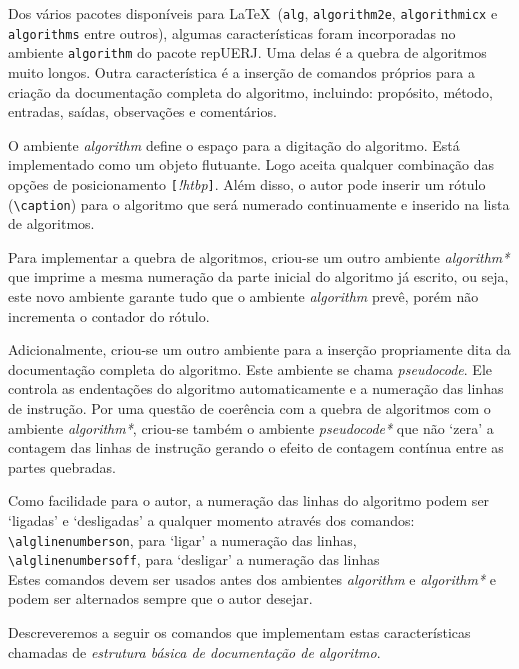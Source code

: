 \documentclass[a4paper,12pt,oneside,onecolumn]{article}
\newcommand{\comando}[1]{\texttt{\textbackslash #1}}
\newcommand{\opcoes}[1]{\texttt{[}\textsl{#1}\texttt{]}}
\newcommand{\repUERJ}{\textsf{repUERJ}}
\begin{document}
Dos vários pacotes disponíveis para \LaTeX\ (\texttt{alg}, \texttt{algorithm2e}, \texttt{algorithmicx} e \texttt{algorithms} entre outros), algumas características foram incorporadas no ambiente \texttt{algorithm} do pacote \repUERJ. Uma delas é a quebra de algoritmos muito longos. Outra característica é a inserção de comandos próprios para a criação da documentação completa do algoritmo, incluindo: propósito, método, entradas, saídas, observações e comentários.

O ambiente \textsl{algorithm} define o espaço para a digitação do algoritmo. Está implementado como um objeto flutuante. Logo aceita qualquer combinação das opções de posicionamento \opcoes{!htbp}. Além disso, o autor pode inserir um rótulo (\comando{caption}) para o algoritmo que será numerado continuamente e inserido na lista de algoritmos.

Para implementar a quebra de algoritmos, criou-se um outro ambiente \textsl{algorithm*} que imprime a mesma numeração da parte inicial do algoritmo já escrito, ou seja, este novo ambiente garante tudo que o ambiente \textsl{algorithm} prevê, porém não incrementa o contador do rótulo.

Adicionalmente, criou-se um outro ambiente para a inserção propriamente dita da documentação completa do algoritmo. Este ambiente se chama \textsl{pseudocode}. Ele controla as endentações do algoritmo automaticamente e a numeração das linhas de instrução. Por uma questão de coerência com a quebra de algoritmos com o ambiente \textsl{algorithm*}, criou-se também o ambiente \textsl{pseudocode*} que não `zera' a contagem das linhas de instrução gerando o efeito de contagem contínua entre as partes quebradas.

Como facilidade para o autor, a numeração das linhas do algoritmo podem ser `ligadas' e `desligadas' a qualquer momento através dos comandos:\\

  \comando{alglinenumberson}, para `ligar' a numeração das linhas,\\

  \comando{alglinenumbersoff}, para `desligar' a numeração das linhas\\

Estes comandos devem ser usados antes dos ambientes \textsl{algorithm} e \textsl{algorithm*} e podem ser alternados sempre que o autor desejar.

Descreveremos a seguir os comandos que implementam estas características chamadas de \textsl{estrutura básica de documentação de algoritmo}.
\end{document}
